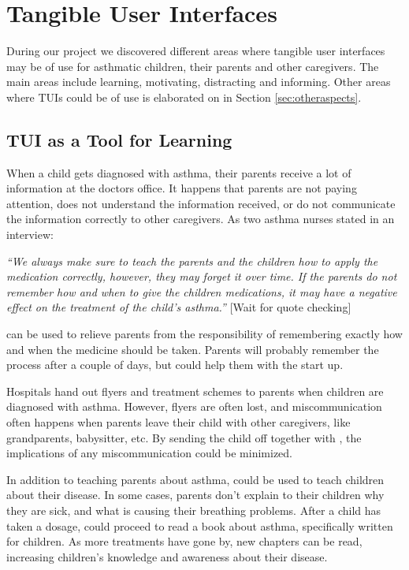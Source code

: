 \section{Tangible User Interfaces}
\label{sec:resultstui}
During our project we discovered different areas where tangible user interfaces may be of use for asthmatic children, their parents and other caregivers. The main areas include learning, motivating, distracting and informing. Other areas where TUIs could be of use is elaborated on in Section \ref{sec:otheraspects}.


\subsection{TUI as a Tool for Learning}

When a child gets diagnosed with asthma, their parents receive a lot of information at the doctors office. It happens that parents are not paying attention, does not understand the information received, or do not communicate the information correctly to other caregivers. As two asthma nurses stated in an interview: 

\textit{``We always make sure to teach the parents and the children how to apply the medication correctly, however, they may forget it over time. If the parents do not remember how and when to give the children medications, it may have a negative effect on the treatment of the child's asthma.''}
[Wait for quote checking]

\buddy{} can be used to relieve parents from the responsibility of remembering exactly how and when the medicine should be taken. Parents will probably remember the process after a couple of days, but \buddy{} could help them with the start up. 

Hospitals hand out flyers and treatment schemes to parents when children are diagnosed with asthma. However, flyers are often lost, and miscommunication often happens when parents leave their child with other caregivers, like grandparents, babysitter, etc. By sending the child off together with \buddy{}, the implications of any miscommunication could be minimized.    

In addition to teaching parents about asthma, \buddy{} could be used to teach children about their disease. In some cases, parents don't explain to their children why they are sick, and what is causing their breathing problems. After a child has taken a dosage, \buddy{} could proceed to read a book about asthma, specifically written for children. As more treatments have gone by, new chapters can be read, increasing children's knowledge and awareness about their disease.   

